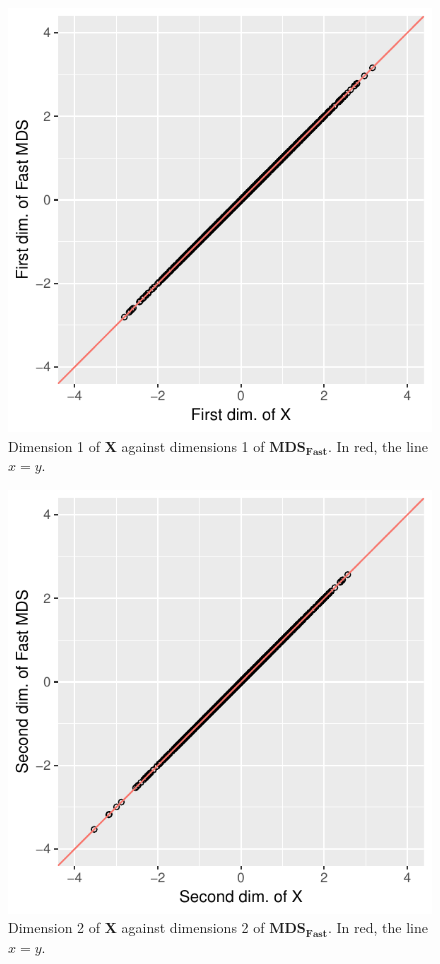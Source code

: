 \documentclass[11pt]{report}
\begin{document}
\begin{figure}
    \centering
    \includegraphics[scale = 1]{./images/first_fast.pdf} 
    \caption{Dimension 1 of \textbf{X} against dimensions 1 of  $\mathbf{MDS_{Fast}}$. In red, the line $x=y$.}
    \label{fast_example1}
\end{figure}

\begin{figure}
    \centering
    \includegraphics[scale = 1]{./images/second_fast.pdf}
    \caption{Dimension 2 of \textbf{X} against dimensions 2 of  $\mathbf{MDS_{Fast}}$. In red, the line $x=y$.}
    \label{fast_example2}
\end{figure}
\end{document}
